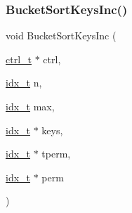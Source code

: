 \subsubsection{\texorpdfstring{Bucket\+Sort\+Keys\+Inc()}{BucketSortKeysInc()}}
{\footnotesize\ttfamily void Bucket\+Sort\+Keys\+Inc (\begin{DoxyParamCaption}\item[{\hyperlink{a00742}{ctrl\+\_\+t} $\ast$}]{ctrl,  }\item[{\hyperlink{a00876_aaa5262be3e700770163401acb0150f52}{idx\+\_\+t}}]{n,  }\item[{\hyperlink{a00876_aaa5262be3e700770163401acb0150f52}{idx\+\_\+t}}]{max,  }\item[{\hyperlink{a00876_aaa5262be3e700770163401acb0150f52}{idx\+\_\+t} $\ast$}]{keys,  }\item[{\hyperlink{a00876_aaa5262be3e700770163401acb0150f52}{idx\+\_\+t} $\ast$}]{tperm,  }\item[{\hyperlink{a00876_aaa5262be3e700770163401acb0150f52}{idx\+\_\+t} $\ast$}]{perm }\end{DoxyParamCaption})}

